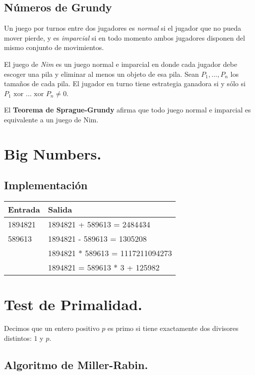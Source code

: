 \documentclass[12pt, letterpaper, twoside]{article}
\begin{document}
\subsection{Números de Grundy}

Un juego por turnos entre dos jugadores es \textit{normal} si el jugador que no pueda mover pierde, y es \textit{imparcial} si en todo momento ambos jugadores disponen del mismo conjunto de movimientos.

El juego de \textit{Nim} es un juego normal e imparcial en donde cada jugador debe escoger una pila y eliminar al menos un objeto de esa pila. Sean $P_1, \ldots, P_n$ los tamaños de cada pila. El jugador en turno tiene estrategia ganadora si y sólo si $P_1 \text{ xor } \ldots \text{ xor } P_n \neq 0$.

El \textbf{Teorema de Sprague-Grundy} afirma que todo juego normal e imparcial es equivalente a un juego de Nim.

\newpage

\section{Big Numbers.}

\subsection{Implementación}

 \medskip

\begin{tabular}{|p{7cm}|p{7cm}|}
\hline
\textbf{Entrada} & \textbf{Salida}\\ \hline
1894821 & 1894821 + 589613 = 2484434\\
589613  & 1894821 - 589613 = 1305208\\ 
        & 1894821 * 589613 = 1117211094273\\ 
        & 1894821 = 589613 * 3 + 125982\\ \hline
\end{tabular}

\newpage

\section{Test de Primalidad.}

Decimos que un entero positivo $p$ es primo si tiene exactamente dos divisores distintos: $1$ y $p$.

\subsection{Algoritmo de Miller-Rabin.}
\end{document}
